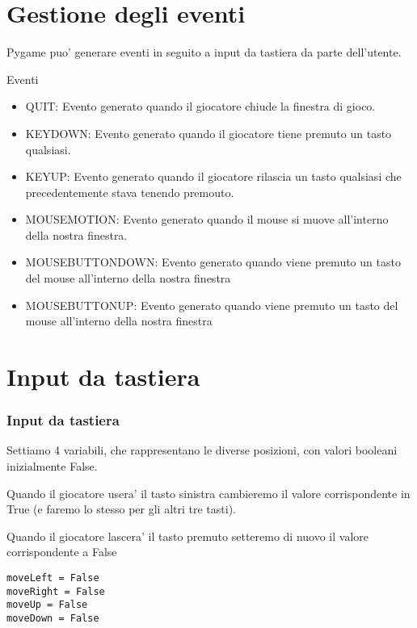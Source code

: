 \documentclass{beamer}
\begin{document}
\section{Gestione degli eventi}

\begin{frame}[fragile]
Pygame puo' generare eventi in seguito a input da tastiera da parte dell'utente.

\begin{block}{Eventi}
    \begin{itemize}
        \item QUIT: Evento generato quando il giocatore chiude la finestra di gioco.
        \item KEYDOWN: Evento generato quando il giocatore tiene premuto un tasto qualsiasi.
        \item KEYUP: Evento generato quando il giocatore rilascia un tasto qualsiasi che precedentemente stava tenendo premouto.
        \item MOUSEMOTION: Evento generato quando il mouse si muove all'interno della nostra finestra.
        \item MOUSEBUTTONDOWN: Evento generato quando viene premuto un tasto del mouse all'interno della nostra finestra
        \item MOUSEBUTTONUP: Evento generato quando viene premuto un tasto del mouse all'interno della nostra finestra
    \end{itemize}
\end{block}

\end{frame}

\section{Input da tastiera}

\begin{frame}[fragile]
    \frametitle{Input da tastiera}
    Settiamo 4 variabili, che rappresentano le diverse posizioni, con valori booleani inizialmente False.
    
    Quando il giocatore usera' il tasto sinistra cambieremo il valore corrispondente in True (e faremo lo stesso per gli altri tre tasti).
    
    Quando il giocatore lascera' il tasto premuto setteremo di nuovo il valore corrispondente a False
    \begin{lstlisting}
moveLeft = False
moveRight = False                                                                                                             
moveUp = False
moveDown = False 
    \end{lstlisting}
\end{frame}
\end{document}

